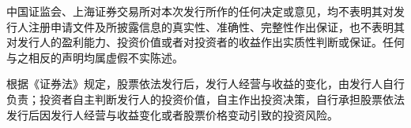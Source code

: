 
中国证监会、上海证券交易所对本次发行所作的任何决定或意见，均不表明其对发
行人注册申请文件及所披露信息的真实性、准确性、完整性作出保证，也不表明其
对发行人的盈利能力、投资价值或者对投资者的收益作出实质性判断或保证。任何
与之相反的声明均属虚假不实陈述。

根据《证券法》规定，股票依法发行后，发行人经营与收益的变化，由发行人自行
负责；投资者自主判断发行人的投资价值，自主作出投资决策，自行承担股票依法
发行后因发行人经营与收益变化或者股票价格变动引致的投资风险。

\clearpage
